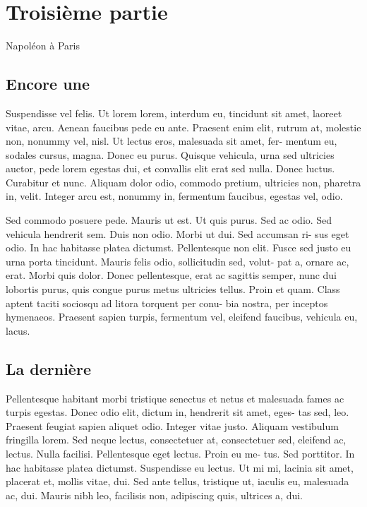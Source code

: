 \documentclass[12pt,twoside]{book}
\begin{document}
\section{Troisième partie}

Napoléon à Paris


\subsection{Encore une}

Suspendisse vel felis. Ut lorem lorem, interdum eu, tincidunt sit amet,
laoreet vitae, arcu. Aenean faucibus pede eu ante. Praesent enim elit, rutrum
at, molestie non, nonummy vel, nisl. Ut lectus eros, malesuada sit amet, fer-
mentum eu, sodales cursus, magna. Donec eu purus. Quisque vehicula, urna
sed ultricies auctor, pede lorem egestas dui, et convallis elit erat sed nulla.
Donec luctus. Curabitur et nunc. Aliquam dolor odio, commodo pretium,
ultricies non, pharetra in, velit. Integer arcu est, nonummy in, fermentum
faucibus, egestas vel, odio.

Sed commodo posuere pede. Mauris ut est. Ut quis purus. Sed ac odio.
Sed vehicula hendrerit sem. Duis non odio. Morbi ut dui. Sed accumsan ri-
sus eget odio. In hac habitasse platea dictumst. Pellentesque non elit. Fusce
sed justo eu urna porta tincidunt. Mauris felis odio, sollicitudin sed, volut-
pat a, ornare ac, erat. Morbi quis dolor. Donec pellentesque, erat ac sagittis
semper, nunc dui lobortis purus, quis congue purus metus ultricies tellus.
Proin et quam. Class aptent taciti sociosqu ad litora torquent per conu-
bia nostra, per inceptos hymenaeos. Praesent sapien turpis, fermentum vel,
eleifend faucibus, vehicula eu, lacus.

\subsection{La dernière}
Pellentesque habitant morbi tristique senectus et netus et malesuada
fames ac turpis egestas. Donec odio elit, dictum in, hendrerit sit amet, eges-
tas sed, leo. Praesent feugiat sapien aliquet odio. Integer vitae justo. Aliquam
vestibulum fringilla lorem. Sed neque lectus, consectetuer at, consectetuer
sed, eleifend ac, lectus. Nulla facilisi. Pellentesque eget lectus. Proin eu me-
tus. Sed porttitor. In hac habitasse platea dictumst. Suspendisse eu lectus.
Ut mi mi, lacinia sit amet, placerat et, mollis vitae, dui. Sed ante tellus,
tristique ut, iaculis eu, malesuada ac, dui. Mauris nibh leo, facilisis non,
adipiscing quis, ultrices a, dui.
\end{document}
